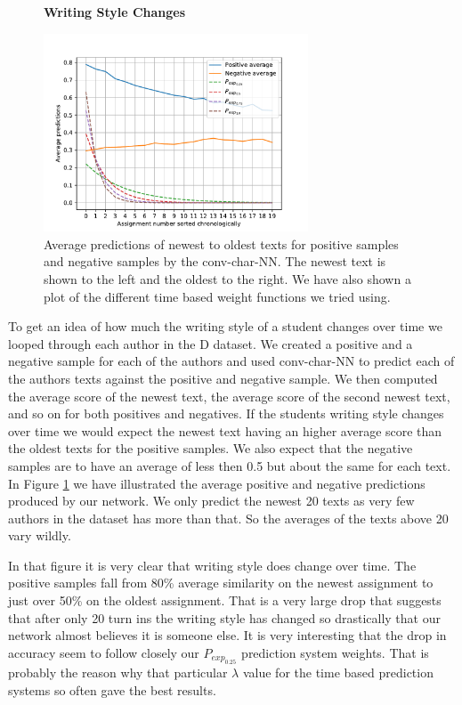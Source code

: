 \begin{figure}
    \centering
    \textbf{Writing Style Changes}\par\medskip
    \includegraphics[width=0.7\textwidth]{./pictures/discussion/writing_style_change}
    \caption{Average predictions of newest to oldest texts for positive samples
        and negative samples by the \gls{conv-char-NN}. The newest text is shown
        to the left and the oldest to the right. We have also shown a plot of
        the different time based weight functions we tried using.}
    \label{fig:writing_style_changes}
\end{figure}

To get an idea of how much the writing style of a student changes over time we
looped through each author in the \gls{D} dataset. We created a positive and a
negative sample for each of the authors and used \gls{conv-char-NN} to predict
each of the authors texts against the positive and negative sample. We then
computed the average score of the newest text, the average score of the second
newest text, and so on for both positives and negatives. If the students writing
style changes over time we would expect the newest text having an higher average
score than the oldest texts for the positive samples. We also expect that the
negative samples are to have an average of less then 0.5 but about the same
for each text. In Figure \ref{fig:writing_style_changes} we have illustrated
the average positive and negative predictions produced by our network. We only
predict the newest 20 texts as very few authors in the dataset has more than
that. So the averages of the texts above 20 vary wildly.

In that figure it is very clear that writing style does change over time. The
positive samples fall from 80\% average similarity on the newest assignment to
just over 50\% on the oldest assignment. That is a very large drop that suggests
that after only 20 turn ins the writing style has changed so drastically that
our network almost believes it is someone else. It is very interesting that the
drop in accuracy seem to follow closely our $P_{exp_{0.25}}$ prediction system
weights. That is probably the reason why that particular $\lambda$ value for the
time based prediction systems so often gave the best results.

